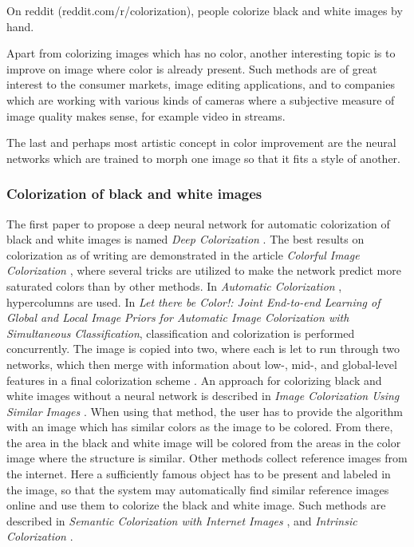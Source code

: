 On reddit (reddit.com/r/colorization), people colorize black and white images by hand.

Apart from colorizing images which has no color, another interesting topic is to improve on image where color is already present. Such methods are of great interest to the consumer markets, image editing applications, and to companies which are working with various kinds of cameras where a subjective measure of image quality makes sense, for example video in streams. 

The last and perhaps most artistic concept in color improvement are the neural networks which are trained to morph one image so that it fits a style of another. 


\subsubsection{Colorization of black and white images}
The first paper to propose a deep neural network for automatic colorization of black and white images is named \emph{Deep Colorization} \citep{Deep-colorization}. The best results on colorization as of writing are demonstrated in the article \emph{Colorful Image Colorization} \citep{Colorful-colorization}, where several tricks are utilized to make the network predict more saturated colors than by other methods. In \emph{Automatic Colorization} \citep{Automatic-colorization}, hypercolumns are used. In \emph{Let there be Color!: Joint End-to-end Learning of Global and Local Image Priors for Automatic Image Colorization with Simultaneous Classification}, classification and colorization is performed concurrently. The image is copied into two, where each is let to run through two networks, which then merge with information about low-, mid-, and global-level features in a final colorization scheme \citep{Lettherebecolor}. An approach for colorizing black and white images without a neural network is described in \emph{Image Colorization Using Similar Images} \citep{Gupta}. When using that method, the user has to provide the algorithm with an image which has similar colors as the image to be colored. From there, the area in the black and white image will be colored from the areas in the color image where the structure is similar. Other methods collect reference images from the internet. Here a sufficiently famous object has to be present and labeled in the image, so that the system may automatically find similar reference images online and use them to colorize the black and white image. Such methods are described in \emph{Semantic Colorization with Internet Images} \citep{Semantic-Internet}, and \emph{Intrinsic Colorization} \citep{2008-intrinsic}.

